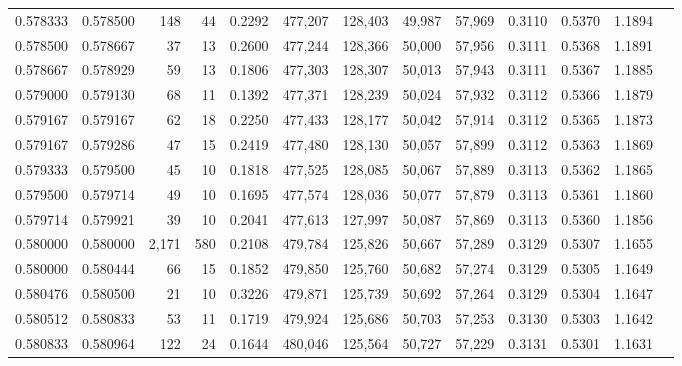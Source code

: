 \begin{tabular}{rrrrrrrrrrrrr}
0.578333 & 0.578500 &   148 &  44 &                                     0.2292 & 477,207 & 128,403 &  49,987 &  57,969 & 0.3110 & 0.5370 & 1.1894 \\
0.578500 & 0.578667 &    37 &  13 &                                     0.2600 & 477,244 & 128,366 &  50,000 &  57,956 & 0.3111 & 0.5368 & 1.1891 \\
0.578667 & 0.578929 &    59 &  13 &                                     0.1806 & 477,303 & 128,307 &  50,013 &  57,943 & 0.3111 & 0.5367 & 1.1885 \\
0.579000 & 0.579130 &    68 &  11 &                                     0.1392 & 477,371 & 128,239 &  50,024 &  57,932 & 0.3112 & 0.5366 & 1.1879 \\
0.579167 & 0.579167 &    62 &  18 &                                     0.2250 & 477,433 & 128,177 &  50,042 &  57,914 & 0.3112 & 0.5365 & 1.1873 \\
0.579167 & 0.579286 &    47 &  15 &                                     0.2419 & 477,480 & 128,130 &  50,057 &  57,899 & 0.3112 & 0.5363 & 1.1869 \\
0.579333 & 0.579500 &    45 &  10 &                                     0.1818 & 477,525 & 128,085 &  50,067 &  57,889 & 0.3113 & 0.5362 & 1.1865 \\
0.579500 & 0.579714 &    49 &  10 &                                     0.1695 & 477,574 & 128,036 &  50,077 &  57,879 & 0.3113 & 0.5361 & 1.1860 \\
0.579714 & 0.579921 &    39 &  10 &                                     0.2041 & 477,613 & 127,997 &  50,087 &  57,869 & 0.3113 & 0.5360 & 1.1856 \\
0.580000 & 0.580000 & 2,171 & 580 &                                     0.2108 & 479,784 & 125,826 &  50,667 &  57,289 & 0.3129 & 0.5307 & 1.1655 \\
0.580000 & 0.580444 &    66 &  15 &                                     0.1852 & 479,850 & 125,760 &  50,682 &  57,274 & 0.3129 & 0.5305 & 1.1649 \\
0.580476 & 0.580500 &    21 &  10 &                                     0.3226 & 479,871 & 125,739 &  50,692 &  57,264 & 0.3129 & 0.5304 & 1.1647 \\
0.580512 & 0.580833 &    53 &  11 &                                     0.1719 & 479,924 & 125,686 &  50,703 &  57,253 & 0.3130 & 0.5303 & 1.1642 \\
0.580833 & 0.580964 &   122 &  24 &                                     0.1644 & 480,046 & 125,564 &  50,727 &  57,229 & 0.3131 & 0.5301 & 1.1631 \\

\end{tabular}
